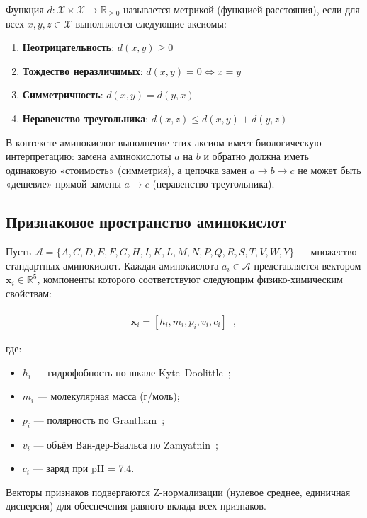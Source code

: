 \documentclass[12pt]{article}
\begin{document}
Функция $d: \mathcal{X} \times \mathcal{X} \to \mathbb{R}_{\ge 0}$ называется метрикой (функцией расстояния), если для всех $x, y, z \in \mathcal{X}$ выполняются следующие аксиомы:

\begin{enumerate}
    \item \textbf{Неотрицательность}: $d(x, y) \ge 0$
    \item \textbf{Тождество неразличимых}: $d(x, y) = 0 \iff x = y$
    \item \textbf{Симметричность}: $d(x, y) = d(y, x)$
    \item \textbf{Неравенство треугольника}: $d(x, z) \le d(x, y) + d(y, z)$
\end{enumerate}

В контексте аминокислот выполнение этих аксиом имеет биологическую интерпретацию: замена аминокислоты $a$ на $b$ и обратно должна иметь одинаковую «стоимость» (симметрия), а цепочка замен $a \to b \to c$ не может быть «дешевле» прямой замены $a \to c$ (неравенство треугольника).

\subsection{Признаковое пространство аминокислот}

Пусть $\mathcal{A} = \{A, C, D, E, F, G, H, I, K, L, M, N, P, Q, R, S, T, V, W, Y\}$ --- множество стандартных аминокислот. Каждая аминокислота $a_i \in \mathcal{A}$ представляется вектором $\mathbf{x}_i \in \mathbb{R}^5$, компоненты которого соответствуют следующим физико-химическим свойствам:

\begin{align}
\mathbf{x}_i = [h_i, m_i, p_i, v_i, c_i]^{\top},
\label{eq:features}
\end{align}

где:
\begin{itemize}
    \item $h_i$ --- гидрофобность по шкале Kyte--Doolittle~\cite{kyte1982};
    \item $m_i$ --- молекулярная масса (г/моль);
    \item $p_i$ --- полярность по Grantham~\cite{grantham1974};
    \item $v_i$ --- объём Ван-дер-Ваальса по Zamyatnin~\cite{zamyatnin1972};
    \item $c_i$ --- заряд при pH = 7.4.
\end{itemize}

Векторы признаков подвергаются Z-нормализации (нулевое среднее, единичная дисперсия) для обеспечения равного вклада всех признаков.
\end{document}

